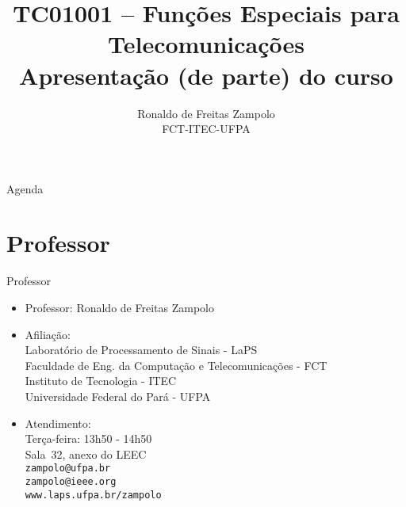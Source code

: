 \documentclass[
size=17pt,
paper=smartboard,
mode=present,
display=slidesnotes,
style=paintings,
nopagebreaks,
blackslide,
fleqn]{powerdot}
\title{\Large TC01001 -- Funções Especiais para Telecomunicações\\ \vspace{1cm}Apresentação (de parte) do curso}
\author{Ronaldo de Freitas Zampolo\\FCT-ITEC-UFPA}
\date{ }
\begin{document}
   \maketitle[randomdots={false}]
   \begin{slide}{Agenda}
      \tableofcontents[content=sections]
   \end{slide}

   \section[ slide = false ]{Professor }
      \begin{slide}[toc=]{Professor}
         \begin{itemize}
            \item Professor: Ronaldo de Freitas Zampolo
            \item Afiliação:\\
                  Laboratório de Processamento de Sinais - LaPS\\
                  Faculdade de Eng. da Computação e Telecomunicações - FCT\\
                  Instituto de Tecnologia - ITEC\\
                  Universidade Federal do Pará - UFPA
            \item Atendimento:\\
                  Terça-feira: 13h50 - 14h50\\
                  Sala~32, anexo do LEEC\\
                  \texttt{zampolo@ufpa.br}\\ 
                  \texttt{zampolo@ieee.org}\\
                  \texttt{www.laps.ufpa.br/zampolo}
         \end{itemize}
      \end{slide}
      
\end{document}
